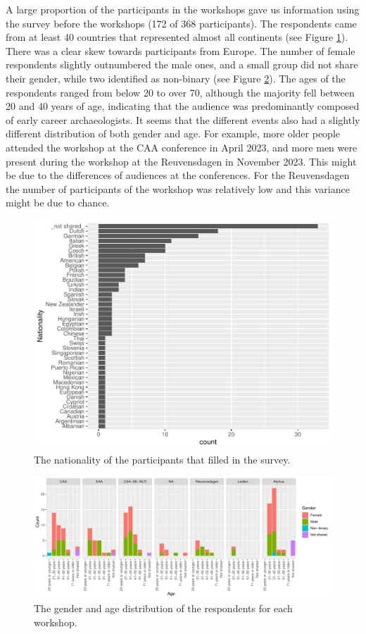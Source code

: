 \documentclass[
]{article}
\begin{document}
A large proportion of the participants in the workshops gave us information using the survey before the workshops (172 of 368 participants). The respondents came from at least 40 countries that represented almost all continents (see Figure \ref{fig:nationality}). There was a clear skew towards participants from Europe. The number of female respondents slightly outnumbered the male ones, and a small group did not share their gender, while two identified as non-binary (see Figure \ref{fig:gender-age}). The ages of the respondents ranged from below 20 to over 70, although the majority fell between 20 and 40 years of age, indicating that the audience was predominantly composed of early career archaeologists. It seems that the different events also had a slightly different distribution of both gender and age. For example, more older people attended the workshop at the CAA conference in April 2023, and more men were present during the workshop at the Reuvensdagen in November 2023. This might be due to the differences of audiences at the conferences. For the Reuvensdagen the number of participants of the workshop was relatively low and this variance might be due to chance.

\begin{figure}
\centering
\includegraphics{paper_files/figure-latex/nationality-1.pdf}
\caption{\label{fig:nationality}The nationality of the participants that filled in the survey.}
\end{figure}

\begin{figure}
\centering
\includegraphics{paper_files/figure-latex/gender-age-1.pdf}
\caption{\label{fig:gender-age}The gender and age distribution of the respondents for each workshop.}
\end{figure}
\end{document}

